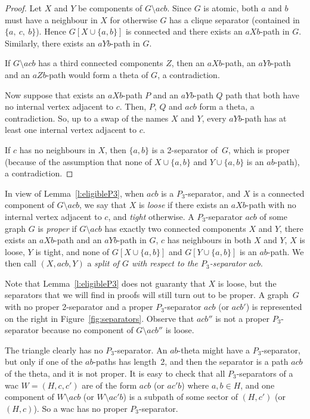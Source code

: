 \documentclass[11pt]{article}
\newcommand{\sm}{\setminus}
\begin{document}
\begin{proof}
  Let $X$ and $Y$ be components of $G\sm acb$. Since $G$ is atomic, both $a$ and $b$ must have a neighbour in $X$ for otherwise $G$ has a clique separator (contained in $\{a,~c,~b\}$).  Hence $G[X\cup\{a,b\}]$ is connected and there exists an $aXb$-path in $G$. Similarly, there exists an $aYb$-path in $G$.
  
  If $G\sm acb$ has a third connected components $Z$, then an $aXb$-path, an $aYb$-path and an $aZb$-path would form a theta of $G$, a contradiction. 
  
  Now suppose that exists  an $aXb$-path $P$ and an $aYb$-path $Q$ path that both have no internal vertex adjacent to $c$. Then, $P$, $Q$ and $acb$ form a theta, a contradiction. So, up to a swap of the names $X$ and $Y$, every $aYb$-path has at least one internal vertex adjacent to $c$.
  
  If $c$ has no neighbours in $X$, then $\{a, b\}$ is a  2-separator of~$G$, which is proper (because of the assumption that none of $X\cup \{a, b\}$ and $Y\cup \{a, b\}$ is an $ab$-path), a  contradiction. 
\end{proof}


In view of Lemma~\ref{l:eligibleP3}, when $acb$ is a $P_3$-separator, and $X$ is a connected component of $G\sm acb$, we say that $X$ is \emph{loose} if there exists an $aXb$-path with no internal vertex adjacent to $c$, and \emph{tight} otherwise.
A $P_3$-separator $acb$ of some graph $G$ is \emph{proper} if $G\sm acb$ has exactly two connected components $X$ and $Y$,  there exists an $aXb$-path and an $aYb$-path in $G$, $c$ has neighbours in both $X$ and $Y$, $X$ is loose, $Y$ is tight, and none of $G[X \cup \{a, b\}]$ and $G[Y \cup \{a, b\}]$ is an $ab$-path.  We then call $(X, acb, Y)$ a \emph{split of $G$ with respect to the $P_3$-separator $acb$}.

Note that Lemma~\ref{l:eligibleP3} does not guaranty that $X$ is loose, but the separators that we will find in proofs will still turn out to be proper.  
A graph~$G$ with no proper 2-separator and a proper $P_3$-separator $acb$ (or $acb'$) is represented on the right in Figure~\ref{fig:separators}.  Observe that $acb''$ is not a proper $P_3$-separator because no component of $G\sm acb''$ is loose. 

The triangle clearly has no $P_3$-separator. An $ab$-theta might have a $P_3$-separator, but only if one of the $ab$-paths has length~2, and then the separator is a path $acb$ of the theta, and it is not proper.  It is easy to check that all $P_3$-separators of a wac $W= (H, c, c')$ are of the form $acb$ (or $ac'b$) where $a, b\in H$, and one component of $W\sm acb$ (or $W\sm ac'b$) is a subpath of some sector of $(H, c')$ (or $(H, c)$).  So a wac has no proper $P_3$-separator. 
\end{document}

